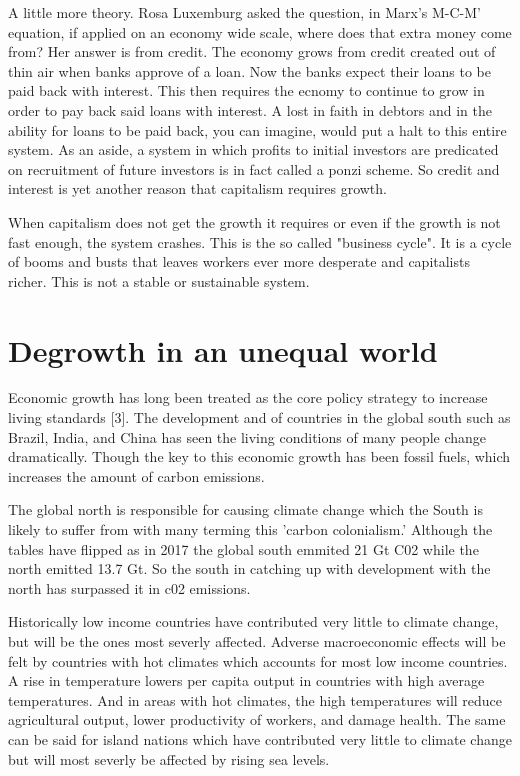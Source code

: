 \documentclass{article}
\begin{document}
A little more theory. Rosa Luxemburg asked the question, in Marx's M-C-M' equation, if applied on an economy wide scale, where does that extra money come from? Her answer is from credit. The economy grows from credit created out of thin air when banks approve of a loan. Now the banks expect their loans to be paid back with interest. This then requires the ecnomy to continue to grow in order to pay back said loans with interest. A lost in faith in debtors and in the ability for loans to be paid back, you can imagine, would put a halt to this entire system. As an aside, a system in which profits to initial investors are predicated on recruitment of future investors is in fact called a ponzi scheme. So credit and interest is yet another reason that capitalism requires growth. 

When capitalism does not get the growth it requires or even if the growth is not fast enough, the system crashes. This is the so called "business cycle". It is a cycle of booms and busts that leaves workers ever more desperate and capitalists richer. This is not a stable or sustainable system.

\section{Degrowth in an unequal world}
Economic growth has long been treated as the core policy strategy to increase living standards [3]. The development and  of countries in the global south such as Brazil, India, and China has seen the living conditions of many people change dramatically. Though the key to this economic growth has been fossil fuels, which increases the amount of carbon emissions.

The global north is responsible for  causing climate change which the South is likely to suffer from with many terming this 'carbon colonialism.' Although the tables have flipped as in 2017 the global south emmited 21 Gt C02 while the north emitted 13.7 Gt. So the south in catching up with development with the north has surpassed it in c02 emissions. 

Historically low income countries have contributed very little to climate change, but will be the ones most severly affected. Adverse macroeconomic effects will be felt by countries with hot climates which accounts for most low income countries. A rise in temperature lowers per capita output in countries with high average temperatures. And in areas with hot climates, the high temperatures will reduce agricultural output, lower productivity of workers, and damage health. The same can be said for island nations which have contributed very little to climate change but will most severly be affected by rising sea levels.
\end{document}
